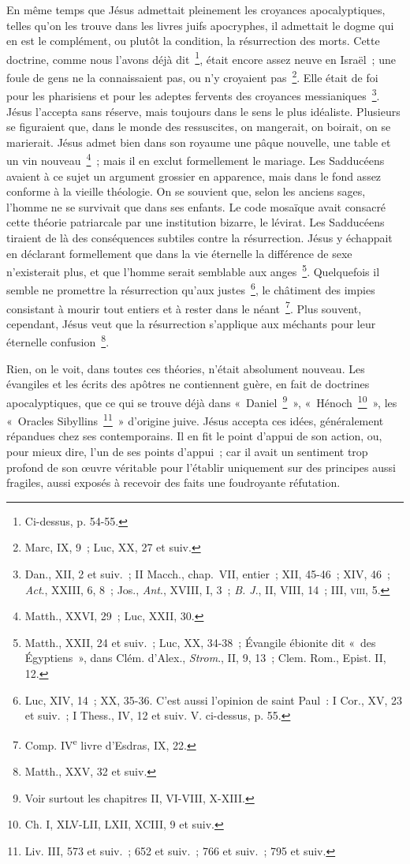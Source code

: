 \documentclass[french,twoside]{book} %
\begin{document}
En même temps que Jésus admettait pleinement les croyances apocalyptiques, telles qu’on les trouve dans les livres juifs apocryphes, il admettait le dogme qui en est le complément, ou plutôt la condition, la résurrection des morts. Cette doctrine, comme nous l’avons déjà dit \footnote{Ci-dessus, p. 54-55.}, était encore assez neuve en Israël ; une foule de gens ne la connaissaient pas, ou n’y croyaient pas \footnote{Marc, IX, 9 ; Luc, XX, 27 et suiv.}. Elle était de foi pour les pharisiens et pour les adeptes fervents des croyances messianiques \footnote{ Dan., XII, 2 et suiv. ; II Macch., chap. VII, entier ; XII, 45-46 ; XIV, 46 ; {\itshape Act}., XXIII, 6, 8 ; Jos., {\itshape Ant}., XVIII, I, 3 ; {\itshape B. J}., II, VIII, 14 ; III, \textsc{viii}, 5.}. Jésus l’accepta sans réserve, mais toujours dans le sens le plus idéaliste. Plusieurs se figuraient que, dans le monde des ressuscites, on mangerait, on boirait, on se marierait. Jésus admet bien dans son royaume une pâque nouvelle, une table et un vin nouveau \footnote{Matth., XXVI, 29 ; Luc, XXII, 30.} ; mais il en exclut formellement le mariage. Les Sadducéens avaient à ce sujet un argument grossier en apparence, mais dans le fond assez conforme à la vieille théologie. On se souvient que, selon les anciens sages, l’homme ne se survivait que dans ses enfants. Le code mosaïque avait consacré cette théorie patriarcale par une institution bizarre, le lévirat. Les Sadducéens tiraient de là des conséquences subtiles contre la résurrection. Jésus y échappait en déclarant formellement que dans la vie éternelle la différence de sexe n’existerait plus, et que l’homme serait semblable aux anges \footnote{ Matth., XXII, 24 et suiv. ; Luc, XX, 34-38 ; Évangile ébionite dit « des Égyptiens », dans Clém. d’Alex., {\itshape Strom}., II, 9, 13 ; Clem. Rom., Epist. II, 12.}. Quelquefois il semble ne promettre la résurrection qu’aux justes \footnote{Luc, XIV, 14 ; XX, 35-36. C’est aussi l’opinion de saint Paul : I Cor., XV, 23 et suiv. ; I Thess., IV, 12 et suiv. V. ci-dessus, p. 55.}, le châtiment des impies consistant à mourir tout entiers et à rester dans le néant \footnote{ Comp. IV\textsuperscript{e} livre d’Esdras, IX, 22.}. Plus souvent, cependant, Jésus veut que la résurrection s’applique aux méchants pour leur éternelle confusion \footnote{Matth., XXV, 32 et suiv.}.\par
Rien, on le voit, dans toutes ces théories, n’était absolument nouveau. Les évangiles et les écrits des apôtres ne contiennent guère, en fait de doctrines apocalyptiques, que ce qui se trouve déjà dans « Daniel \footnote{Voir surtout les chapitres II, VI-VIII, X-XIII.} », « Hénoch \footnote{Ch. I, XLV-LII, LXII, XCIII, 9 et suiv.} », les « Oracles Sibyllins \footnote{Liv. III, 573 et suiv. ; 652 et suiv. ; 766 et suiv. ; 795 et suiv.} » d’origine juive. Jésus accepta ces idées, généralement répandues chez ses contemporains. Il en fit le point d’appui de son action, ou, pour mieux dire, l’un de ses points d’appui ; car il avait un sentiment trop profond de son œuvre véritable pour l’établir uniquement sur des principes aussi fragiles, aussi exposés à recevoir des faits une foudroyante réfutation.\par
\end{document}

